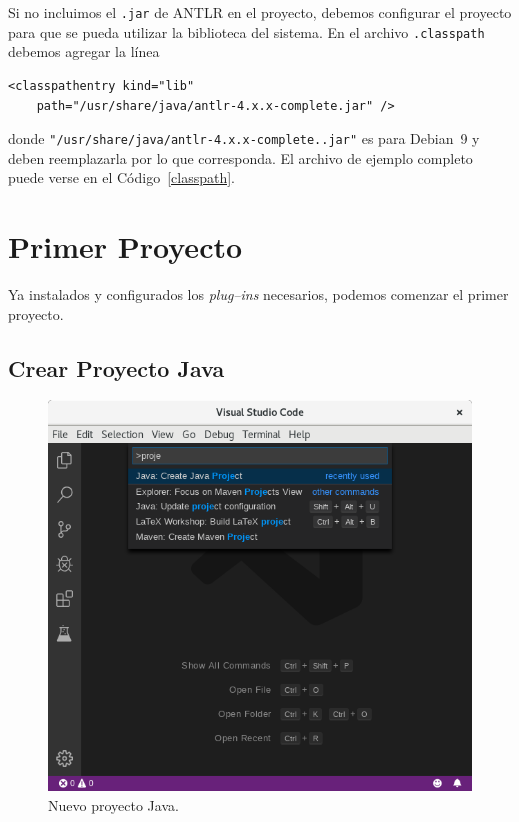 

Si no incluimos el \verb|.jar| de ANTLR en el proyecto, debemos configurar el proyecto para que se pueda utilizar la biblioteca del sistema.  En el archivo \verb|.classpath| debemos agregar la línea
\begin{lstlisting}[style=miXML]
<classpathentry kind="lib"
    path="/usr/share/java/antlr-4.x.x-complete.jar" />	
\end{lstlisting}
donde \verb|"/usr/share/java/antlr-4.x.x-complete..jar"| es para Debian~9 y deben reemplazarla por lo que corresponda.  El archivo de ejemplo completo puede verse en el Código~\ref{classpath}.




\section{Primer Proyecto}
\label{primerproyecto}

Ya instalados y configurados los \emph{plug--ins} necesarios, podemos comenzar el primer proyecto.

\subsection{Crear Proyecto Java}
\label{proyecto_java}

\begin{figure}[t]
	\centering
	\includegraphics[width=.95\textwidth]{img/NuevoProyecto}
	\caption{Nuevo proyecto Java.}
	\label{maven_nuevo}
\end{figure}


